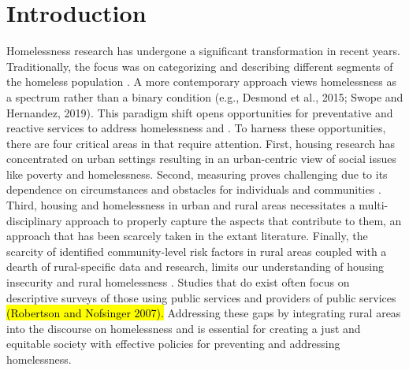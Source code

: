 \chapter{Introduction} 

Homelessness research has undergone a significant transformation in recent years. Traditionally, the focus was on categorizing and describing different segments of the homeless population \citep{lee_homelessness_2021}. A more contemporary approach views homelessness as a spectrum rather than a binary condition (e.g., Desmond et al., 2015; Swope and Hernandez, 2019). This paradigm shift opens opportunities for preventative and reactive services to address homelessness and \hs. To harness these opportunities, there are four critical areas in that require attention. First, housing research has concentrated on urban settings resulting in an urban-centric view of social issues like poverty and homelessness. Second, measuring \hs proves challenging due to its dependence on circumstances and obstacles for individuals and communities \citep{leifheit_building_2022}. Third, housing and homelessness in urban and rural areas necessitates a multi-disciplinary approach to properly capture the aspects that contribute to them, an approach that has been scarcely taken in the extant literature.  Finally, the scarcity of identified community-level risk factors in rural areas coupled with a dearth of rural-specific data and research, limits our understanding of housing insecurity and rural homelessness \citep{gleason_using_2021}. Studies that do exist often focus on descriptive surveys of those using public services and providers of public services \hl{(Robertson and Nofsinger 2007). }Addressing these gaps by integrating rural areas into the discourse on homelessness and \hs is essential for creating a just and equitable society with effective policies for preventing and addressing homelessness\citep{oregan_how_2021}.

